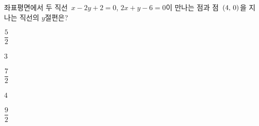 좌표평면에서 두 직선~$x-2y+2=0$, $2x+y-6=0$이 만나는 점과 점~$(4,\mkern3mu 0)$을 지나는 직선의 $y$절편은?
\begin{choices32}{\rule[-3ex]{0pt}{8ex}$\dfrac{5}{2}$}{\rule[-3ex]{0pt}{8ex}$3$}{\rule[-3ex]{0pt}{8ex}$\dfrac{7}{2}$}{\rule[-3ex]{0pt}{8ex}$4$}{\rule[-3ex]{0pt}{8ex}$\dfrac{9}{2}$}\end{choices32}
